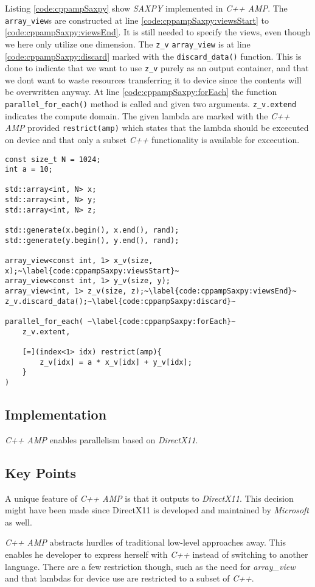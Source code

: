 Listing \ref{code:cppampSaxpy} show \textit{SAXPY} implemented in \textit{C++ AMP}. The \texttt{array\_view}s are constructed at line \ref{code:cppampSaxpy:viewsStart} to \ref{code:cppampSaxpy:viewsEnd}. It is still needed to specify the views, even though we here only utilize one dimension. The \texttt{z\_v} \texttt{array\_view} is at line \ref{code:cppampSaxpy:discard} marked with the \texttt{discard\_data()} function. This is done to indicate that we want to use \texttt{z\_v} purely as an output container, and that we dont want to waste resources transferring it to device since the contents will be overwritten anyway.
At line \ref{code:cppampSaxpy:forEach} the function \texttt{parallel\_for\_each()} method is called and given two arguments. \texttt{z\_v.extend} indicates the compute domain. The given lambda are marked with the \textit{C++ AMP} provided \texttt{restrict(amp)} which states that the lambda should be excecuted on device and that only a subset \textit{C++} functionality is available for excecution.
\begin{lstlisting}[caption={\textit{C++ AMP} \textit{SAXPY} example.}, label={code:cppampSaxpy}]
const size_t N = 1024;
int a = 10;

std::array<int, N> x;
std::array<int, N> y;
std::array<int, N> z;

std::generate(x.begin(), x.end(), rand);
std::generate(y.begin(), y.end(), rand);

array_view<const int, 1> x_v(size, x);~\label{code:cppampSaxpy:viewsStart}~
array_view<const int, 1> y_v(size, y);
array_view<int, 1> z_v(size, z);~\label{code:cppampSaxpy:viewsEnd}~
z_v.discard_data();~\label{code:cppampSaxpy:discard}~

parallel_for_each( ~\label{code:cppampSaxpy:forEach}~
    z_v.extent,

    [=](index<1> idx) restrict(amp){
        z_v[idx] = a * x_v[idx] + y_v[idx];
    }
)
\end{lstlisting}

\subsection{Implementation}
\textit{C++ AMP} enables parallelism based on \textit{DirectX11}.

\subsection{Key Points}
A unique feature of \textit{C++ AMP} is that it outputs to \textit{DirectX11}. This decision might have been made since DirectX11 is developed and maintained by \textit{Microsoft} as well.

\textit{C++ AMP} abstracts hurdles of traditional low-level approaches away. This enables he developer to express herself with \textit{C++} instead of switching to another language. There are a few restriction though, such as the need for \textit{array\_view} and that lambdas for device use are restricted to a subset of \textit{C++}.
